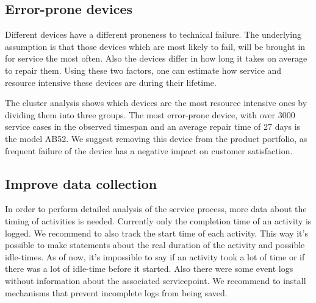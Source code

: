 \documentclass[
]{article}
\begin{document}
\hypertarget{error-prone-devices}{%
\subsection{Error-prone devices}\label{error-prone-devices}}

Different devices have a different proneness to technical failure. The
underlying assumption is that those devices which are most likely to
fail, will be brought in for service the most often. Also the devices
differ in how long it takes on average to repair them. Using these two
factors, one can estimate how service and resource intensive these
devices are during their lifetime.

The cluster analysis shows which devices are the most resource intensive
ones by dividing them into three groups. The most error-prone device,
with over 3000 service cases in the observed timespan and an average
repair time of 27 days is the model AB52. We suggest removing this
device from the product portfolio, as frequent failure of the device has
a negative impact on customer satisfaction.

\hypertarget{improve-data-collection}{%
\subsection{Improve data collection}\label{improve-data-collection}}

In order to perform detailed analysis of the service process, more data
about the timing of activities is needed. Currently only the completion
time of an activity is logged. We recommend to also track the start time
of each activity. This way it's possible to make statements about the
real duration of the activity and possible idle-times. As of now, it's
impossible to say if an activity took a lot of time or if there was a
lot of idle-time before it started. Also there were some event logs
without information about the associated servicepoint. We recommend to
install mechanisms that prevent incomplete logs from being saved.
\end{document}
